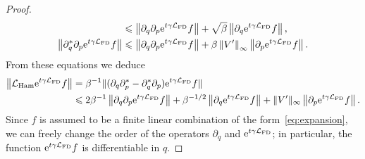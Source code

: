 \documentclass[11pt,a4paper]{article}
\begin{document}
\begin{proof}
\begin{align*}
        &\leq \norm{\partial_q \partial_p \e^{t \gamma \mathcal L_{\rm FD}} f} + \sqrt{\beta} \norm{\partial_q \e^{t \gamma \mathcal L_{\rm FD}} f}, \\
        \norm{\partial_q^* \partial_p \e^{t \gamma \mathcal L_{\rm FD}} f}
        &\leq \norm{\partial_q \partial_p \e^{t \gamma \mathcal L_{\rm FD}} f}
        + \beta \norm{V'}[\infty] \norm{\partial_p \e^{t \gamma \mathcal L_{\rm FD}} f}.
    \end{align*}
    From these equations we deduce
    \begin{align}
        \notag
        \norm{\mathcal L_{\rm Ham} \e^{t \gamma \mathcal L_{\rm FD}} f}
        &= \beta^{-1} \lVert (\partial_q \partial_p^* - \partial_q^* \partial_p) \e^{t \gamma \mathcal L_{\rm FD}} f \rVert \\
        \label{eq:reasoning_action_lham}
        &\leq 2 \beta^{-1} \norm{\partial_q \partial_p \e^{t \gamma \mathcal L_{\rm FD}} f}
        + \beta^{-1/2} \norm{\partial_q \e^{t \gamma \mathcal L_{\rm FD}} f}
        + \norm*{V'}[\infty] \norm{\partial_p \e^{t \gamma \mathcal L_{\rm FD}} f}.
    \end{align}
    Since $f$ is assumed to be a finite linear combination of the form~\eqref{eq:expansion},
    we can freely change the order of the operators $\partial_q$ and $\mathrm{e}^{t \gamma \mathcal L_{\rm FD}}$;
    in particular, the function $\mathrm{e}^{t \gamma \mathcal L_{\rm FD}} f$ is differentiable in $q$.


\end{proof}
\end{document}
